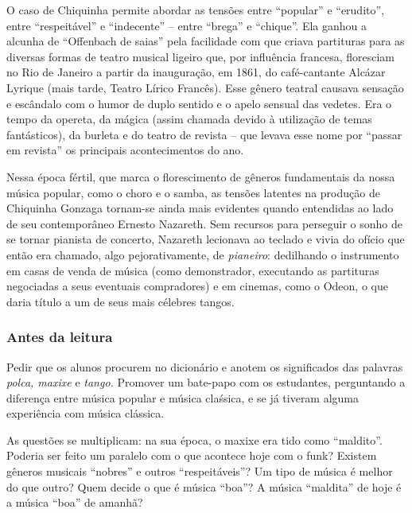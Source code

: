 \documentclass[11pt]{extarticle}
\begin{document}
O caso de Chiquinha permite abordar as tensões entre ``popular'' e
``erudito'', entre ``respeitável'' e ``indecente'' -- entre ``brega'' e
``chique''. Ela ganhou a alcunha de ``Offenbach de saias'' pela
facilidade com que criava partituras para as diversas formas de teatro
musical ligeiro que, por influência francesa, floresciam no Rio de
Janeiro a partir da inauguração, em 1861, do café-cantante Alcázar
Lyrique (mais tarde, Teatro Lírico Francês). Esse gênero teatral causava
sensação e escândalo com o humor de duplo sentido e o apelo sensual das
vedetes. Era o tempo da opereta, da mágica (assim chamada devido à
utilização de temas fantásticos), da burleta e do teatro de revista --
que levava esse nome por ``passar em revista'' os principais
acontecimentos do ano.

Nessa época fértil, que marca o florescimento de gêneros fundamentais da
nossa música popular, como o choro e o samba, as tensões latentes na
produção de Chiquinha Gonzaga tornam-se ainda mais evidentes quando
entendidas ao lado de seu contemporâneo Ernesto Nazareth. Sem recursos
para perseguir o sonho de se tornar pianista de concerto, Nazareth
lecionava ao teclado e vivia do ofício que então era chamado, algo
pejorativamente, de \emph{pianeiro}: dedilhando o instrumento em casas
de venda de música (como demonstrador, executando as partituras
negociadas a seus eventuais compradores) e em cinemas, como o Odeon, o
que daria título a um de seus mais célebres tangos.



\subsubsection{Antes da leitura}

Pedir que os alunos procurem no dicionário e anotem os significados das
palavras \emph{polca, maxixe} e \emph{tango.} Promover um bate-papo com
os estudantes, perguntando a diferença entre música popular e música
claśsica, e se já tiveram alguma experiência com música clássica.

As questões se multiplicam: na sua época, o maxixe era tido como
``maldito''. Poderia ser feito um paralelo com o que acontece hoje com o
funk? Existem gêneros musicais ``nobres'' e outros ``respeitáveis''? Um
tipo de música é melhor do que outro? Quem decide o que é música
``boa''? A música ``maldita'' de hoje é a música ``boa'' de amanhã?
\end{document}
